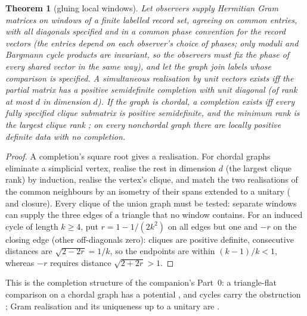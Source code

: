 \documentclass[aps,pra,onecolumn,superscriptaddress,nofootinbib,10pt]{revtex4-2}
\newtheorem{theorem}{Theorem}
\theoremstyle{definition}
\theoremstyle{remark}
\begin{document}
\begin{theorem}[gluing local windows]\label{thm:fmglue}
Let observers supply Hermitian Gram matrices on windows of a finite labelled record set, agreeing on
common entries, with all diagonals specified and in a common phase convention for the record vectors (the
entries depend on each observer's choice of phases; only moduli and Bargmann cycle products are
invariant, so the observers must fix the phase of every shared vector in the same way), and let the graph join labels whose comparison is
specified.  A simultaneous realisation by unit vectors exists iff the partial matrix has a positive
semidefinite completion with unit diagonal (of rank at most $d$ in dimension $d$).  If the graph is chordal, a
completion exists iff every fully specified clique submatrix is positive semidefinite, and the minimum
rank is the largest clique rank \cite{n2-dirac,n2-grone,rf:Dancis1992}; on every nonchordal graph there are locally
positive definite data with no completion.
\end{theorem}
\begin{proof}
A completion's square root gives a realisation.  For chordal graphs eliminate a simplicial vertex,
realise the rest in dimension $d$ (the largest clique rank) by induction, realise the vertex's clique, and
match the two realisations of the common neighbours by an isometry of their spans extended to a unitary
(\cite[Thm.~7]{n2-grone} and closure).  Every clique of the union graph must be tested: separate windows can
supply the three edges of a triangle that no window contains.  For an induced cycle of length $k\ge4$, put
$r=1-1/(2k^2)$ on all edges but one and $-r$ on the closing edge (other off-diagonals zero): cliques are positive
definite, consecutive distances are $\sqrt{2-2r}=1/k$, so the endpoints are within $(k-1)/k<1$, whereas $-r$ requires distance
$\sqrt{2+2r}>1$.
\end{proof}
\noindent This is the completion structure of the companion's Part~0: a triangle-flat comparison on a chordal
graph has a potential \cite[Thm.~0.12, Prop.~0.18]{PaperI}, and cycles carry the obstruction
\cite[Sec.~0.4]{PaperI}; Gram realisation and its uniqueness up to a unitary are
\cite[Props.~0.24, 0.25]{PaperI}.
\end{document}
